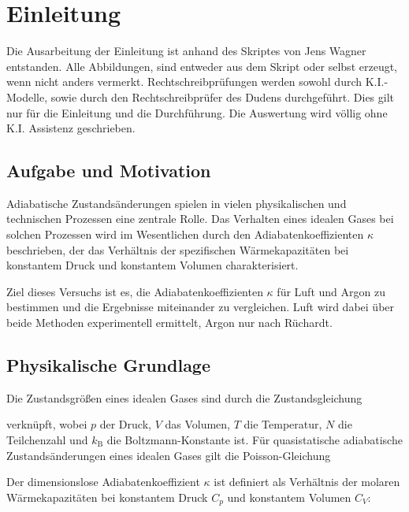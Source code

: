 \chapter{Einleitung} \label{ch:Einleitung}

Die Ausarbeitung der Einleitung ist anhand des Skriptes von Jens Wagner entstanden. Alle Abbildungen, sind entweder aus dem Skript oder selbst erzeugt, wenn nicht anders vermerkt. Rechtschreibprüfungen werden sowohl durch K.I.-Modelle, sowie durch den Rechtschreibprüfer des Dudens durchgeführt.  Dies gilt nur für die Einleitung und die Durchführung. Die Auswertung wird völlig ohne K.I. Assistenz geschrieben. \cite{skriptPAP21, Duden}

\section{Aufgabe und Motivation} \label{sec:AuM}
Adiabatische Zustandsänderungen spielen in vielen physikalischen und technischen Prozessen eine zentrale Rolle. Das Verhalten eines idealen Gases bei solchen Prozessen wird im Wesentlichen durch den Adiabatenkoeffizienten \(\kappa\) beschrieben, der das Verhältnis der spezifischen Wärmekapazitäten bei konstantem Druck und konstantem Volumen charakterisiert.

Ziel dieses Versuchs ist es, die Adiabatenkoeffizienten \(\kappa\) für Luft und Argon zu bestimmen und die Ergebnisse miteinander zu vergleichen. Luft wird dabei über beide Methoden experimentell ermittelt, Argon nur nach Rüchardt.
\section{Physikalische Grundlage} \label{sec:PhyBasics}

Die Zustandsgrößen eines idealen Gases sind durch die Zustandsgleichung


verknüpft, wobei \(p\) der Druck, \(V\) das Volumen, \(T\) die Temperatur, \(N\) die Teilchenzahl und \(k_\mathrm{B}\) die Boltzmann-Konstante ist. Für quasistatische adiabatische Zustandsänderungen eines idealen Gases gilt die Poisson-Gleichung


Der dimensionslose Adiabatenkoeffizient \(\kappa\) ist definiert als Verhältnis der molaren Wärmekapazitäten bei konstantem Druck \(C_p\) und konstantem Volumen \(C_V\):


